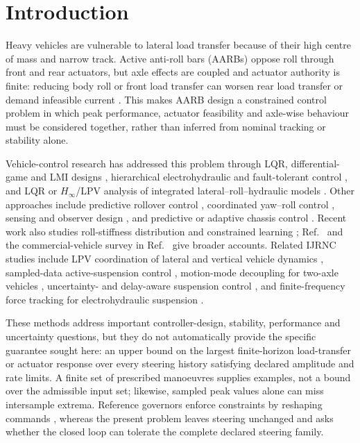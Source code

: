 \documentclass[fleqn,final,5p,times]{elsarticle}
\begin{document}
\section{Introduction}
\label{sec:introduction}

Heavy vehicles are vulnerable to lateral load transfer because of their high centre of mass and narrow track. Active anti-roll bars (AARBs) oppose roll through front and rear actuators, but axle effects are coupled and actuator authority is finite: reducing body roll or front load transfer can worsen rear load transfer or demand infeasible current \cite{sampson2003achievable,sampson2003active}. This makes AARB design a constrained control problem in which peak performance, actuator feasibility and axle-wise behaviour must be considered together, rather than inferred from nominal tracking or stability alone.

Vehicle-control research has addressed this problem through LQR, differential-game and LMI designs \cite{yim2011game,yim2011lmi,yim2013}, hierarchical electrohydraulic and fault-tolerant control \cite{varga2015,nemeth2015,gaspar2005}, and LQR or $H_\infty$/LPV analysis of integrated lateral--roll--hydraulic models \cite{vu2017,vu2019lpv,vu2019leakage}. Other approaches include predictive rollover control \cite{jalali2018}, coordinated yaw--roll control \cite{liang2024}, sensing and observer design \cite{vu2023sensors,tan2024observer}, and predictive or adaptive chassis control \cite{oliveira2025,lu2025}. Recent work also studies roll-stiffness distribution and constrained learning \cite{sonnino2026,huang2026}; Ref.~\cite{tan2024book} and the commercial-vehicle survey in Ref.~\cite{chen2025survey} give broader accounts. Related IJRNC studies include LPV coordination of lateral and vertical vehicle dynamics \cite{fergani2017integrated}, sampled-data active-suspension control \cite{meng2018dualrate}, motion-mode decoupling for two-axle vehicles \cite{hu2020roll}, uncertainty- and delay-aware suspension control \cite{zhang2020semiactive}, and finite-frequency force tracking for electrohydraulic suspension \cite{zhang2024electrohydraulic}.

These methods address important controller-design, stability, performance and uncertainty questions, but they do not automatically provide the specific guarantee sought here: an upper bound on the largest finite-horizon load-transfer or actuator response over every steering history satisfying declared amplitude and rate limits. A finite set of prescribed manoeuvres supplies examples, not a bound over the admissible input set; likewise, sampled peak values alone can miss intersample extrema. Reference governors enforce constraints by reshaping commands \cite{berntorp2021,chakrabarty2023}, whereas the present problem leaves steering unchanged and asks whether the closed loop can tolerate the complete declared steering family.
\end{document}
